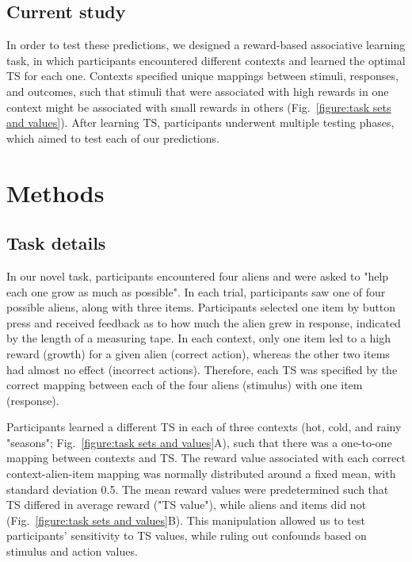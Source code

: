 \documentclass[10pt, letterpaper]{article}
\begin{document}
\subsection{Current study}

In order to test these predictions, we designed a reward-based associative learning task, in which participants encountered different contexts and learned the optimal TS for each one. Contexts specified unique mappings between stimuli, responses, and outcomes, such that stimuli that were associated with high rewards in one context might be associated with small rewards in others (Fig.~\ref{figure:task sets and values}). After learning TS, participants underwent multiple testing phases, which aimed to test each of our predictions.


\section{Methods}

\subsection{Task details}

In our novel task, participants encountered four aliens and were asked to "help each one grow as much as possible". In each trial, participants saw one of four possible aliens, along with three items. Participants selected one item by button press and received feedback as to how much the alien grew in response, indicated by the length of a measuring tape. In each context, only one item led to a high reward (growth) for a given alien (correct action), whereas the other two items had almost no effect (incorrect actions). Therefore, each TS was specified by the correct mapping between each of the four aliens (stimulus) with one item (response). 

Participants learned a different TS in each of three contexts (hot, cold, and rainy "seasons"; Fig.~\ref{figure:task sets and values}A), such that there was a one-to-one mapping between contexts and TS. The reward value associated with each correct context-alien-item mapping was normally distributed around a fixed mean, with standard deviation 0.5. The mean reward values were predetermined such that TS differed in average reward ("TS value"), while aliens and items did not (Fig.~\ref{figure:task sets and values}B). This manipulation allowed us to test participants' sensitivity to TS values, while ruling out confounds based on stimulus and action values. 
\end{document}
